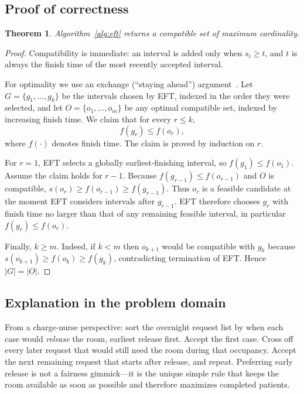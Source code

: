 \documentclass[sigconf,review=false]{acmart}
\newtheorem{theorem}{Theorem}
\theoremstyle{definition}
\begin{document}
\subsection{Proof of correctness}
\label{sec:greedy-proof}

\begin{theorem}
\label{thm:eft}
Algorithm~\ref{alg:eft} returns a compatible set of maximum cardinality.
\end{theorem}

\begin{proof}
Compatibility is immediate: an interval is added only when
$s_i \ge t$, and $t$ is always the finish time of the most recently
accepted interval.

For optimality we use an exchange (``staying ahead'') argument~\cite{kt2005}.
Let $G = \{g_1,\ldots,g_k\}$ be the intervals chosen by EFT, indexed in the
order they were selected, and let $O = \{o_1,\ldots,o_m\}$ be any optimal
compatible set, indexed by increasing finish time. We claim that for every
$r\le k$,
\[
  f(g_r) \le f(o_r),
\]
where $f(\cdot)$ denotes finish time. The claim is proved by induction on
$r$.

For $r=1$, EFT selects a globally earliest-finishing interval, so
$f(g_1)\le f(o_1)$. Assume the claim holds for $r-1$. Because
$f(g_{r-1})\le f(o_{r-1})$ and $O$ is compatible,
$s(o_r)\ge f(o_{r-1})\ge f(g_{r-1})$. Thus $o_r$ is a feasible candidate at
the moment EFT considers intervals after $g_{r-1}$. EFT therefore chooses
$g_r$ with finish time no larger than that of any remaining feasible
interval, in particular $f(g_r)\le f(o_r)$.

Finally, $k\ge m$. Indeed, if $k<m$ then $o_{k+1}$ would be compatible with
$g_k$ because $s(o_{k+1})\ge f(o_k)\ge f(g_k)$, contradicting termination of
EFT. Hence $|G|=|O|$.
\end{proof}

\subsection{Explanation in the problem domain}
\label{sec:greedy-domain}

From a charge-nurse perspective: sort the overnight request list by when
each case would \emph{release} the room, earliest release first. Accept
the first case. Cross off every later request that would still need the
room during that occupancy. Accept the next remaining request that starts
after release, and repeat. Preferring early release is not a fairness
gimmick---it is the unique simple rule that keeps the room available as
soon as possible and therefore maximizes completed patients.
\end{document}
